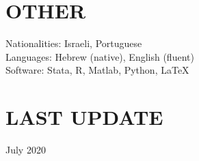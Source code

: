 \documentclass[margin]{res} %
\begin{document}
\begin{resume}
\section{OTHER} 
Nationalities: Israeli, Portuguese \\
Languages: Hebrew (native), English (fluent) \\
Software: Stata, R, Matlab, Python, \LaTeX

\section{LAST UPDATE} 
July 2020

\end{resume}
\end{document}
